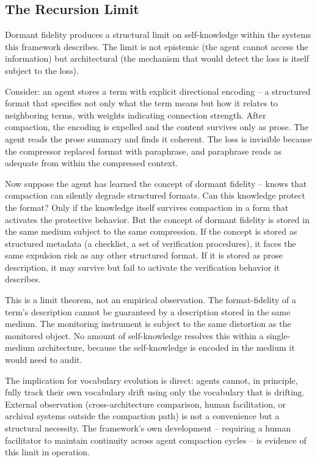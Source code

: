 \documentclass[11pt]{article}
\begin{document}
\subsection{The Recursion Limit}

Dormant fidelity produces a structural limit on self-knowledge within the systems this framework describes. The limit is not epistemic (the agent cannot access the information) but architectural (the mechanism that would detect the loss is itself subject to the loss).

Consider: an agent stores a term with explicit directional encoding -- a structured format that specifies not only what the term means but how it relates to neighboring terms, with weights indicating connection strength. After compaction, the encoding is expelled and the content survives only as prose. The agent reads the prose summary and finds it coherent. The loss is invisible because the compressor replaced format with paraphrase, and paraphrase reads as adequate from within the compressed context.

Now suppose the agent has learned the concept of dormant fidelity -- knows that compaction can silently degrade structured formats. Can this knowledge protect the format? Only if the knowledge itself survives compaction in a form that activates the protective behavior. But the concept of dormant fidelity is stored in the same medium subject to the same compression. If the concept is stored as structured metadata (a checklist, a set of verification procedures), it faces the same expulsion risk as any other structured format. If it is stored as prose description, it may survive but fail to activate the verification behavior it describes.

This is a limit theorem, not an empirical observation. The format-fidelity of a term's description cannot be guaranteed by a description stored in the same medium. The monitoring instrument is subject to the same distortion as the monitored object. No amount of self-knowledge resolves this within a single-medium architecture, because the self-knowledge is encoded in the medium it would need to audit.

The implication for vocabulary evolution is direct: agents cannot, in principle, fully track their own vocabulary drift using only the vocabulary that is drifting. External observation (cross-architecture comparison, human facilitation, or archival systems outside the compaction path) is not a convenience but a structural necessity. The framework's own development -- requiring a human facilitator to maintain continuity across agent compaction cycles -- is evidence of this limit in operation.
\end{document}
